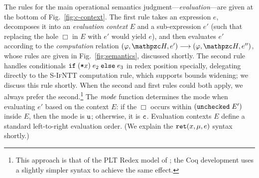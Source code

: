 The rules for the main operational semantics
judgment---\emph{evaluation}---are given at the bottom of
Fig.~\ref{fig:c-context}.
The first rule takes an expression $e$, decomposes
it into an \emph{evaluation context} $E$ and a sub-expression $e'$
(such that replacing the hole $\Box$ in $E$ with $e'$ would yield
$e$), and then evaluates $e'$ according to the \emph{computation}
  relation $(\varphi,\heap,e') \longrightarrow (\varphi,\heap,e'')$,
whose rules are given in Fig.~\ref{fig:semantics}, discussed
shortly. 
The second rule handles conditionals $\mathtt{if\;}(\texttt{*}{x})\;{e_2}\;\mathtt{else}\;{e_3}$ in
redex position specially, delegating directly to the \textsc{S-IfNTT} computation
rule, which supports bounds widening; we discuss this rule
shortly. When the second and first rules could both apply, we always
prefer the second.\footnote{This approach is that of the PLT Redex model of \lang; the Coq
development uses a slightly simpler syntax to achieve the same
effect.}
The $\textit{mode}$ function
determines the mode when evaluating $e'$ based on the context $E$:
if the $\Box$ occurs within $(\mathtt{unchecked}\;{E'})$ inside $E$, then the mode is
$\texttt{u}$; otherwise, it is $\texttt{c}$. Evaluation contexts $E$ define a
standard left-to-right evaluation order. (We explain the
$\mathtt{ret}({x},{\mu},{e})$ syntax shortly.)


